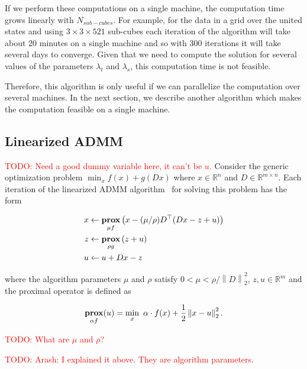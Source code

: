 \documentclass{article}
\newcommand{\attn}[1]{\textcolor{red}{TODO: #1}}
\newcommand{\norm}[1]{\left\lVert #1 \right\rVert}
\DeclareMathOperator*{\prox}{\bf prox}
\begin{document}
If we perform these computations on a single machine, the computation
time grows linearly with $N_{sub-cubes}$. For example, for the data in
a grid over the united states and using $3\times3\times521$ sub-cubes
each iteration of the algorithm will take about 20 minutes on a single
machine and so with 300 iterations it will take several days to
converge. Given that we need to compute the solution for several
values of the parameters $\lambda_t$ and $\lambda_s$, this computation
time is not feasible. 

Therefore, this algorithm is only useful if we can parallelize the
computation over several machines. In the next section, we describe
another algorithm which makes the computation feasible on a single
machine. 

\subsection{Linearized ADMM}
\label{sec:linADMM}


\attn{Need a good dummy variable here, it can't be $u$.} Consider the generic optimization problem
$\min_x f(x)+g(Dx)$
where $x\in \mathbb{R}^n$ and $D\in \mathbb{R}^{m\times n}$. Each
iteration of the linearized ADMM
algorithm~\citep{parikh_proximal_2014} for solving this problem 
has the form

\begin{align}
x & \leftarrow \prox_{\mu f} \left(x - (\mu/\rho)D^\top (D x - z + u )\right)\\
z & \leftarrow \prox_{\rho g} \left(z + u\right) \label{eq:linADMM_steps}\\
u & \leftarrow u + D x - z
\end{align}

\noindent where the algorithm parameters $\mu$ and $\rho$ satisfy $0 < \mu < \rho/\norm{D}_2^2$, $z,u\in \mathbb{R}^m$ and the proximal operator is defined as

\begin{equation}
 \prox_{\alpha f}(u) = \min_x \,\, \alpha \cdot f(x)+\frac{1}{2} \norm{ x-u}_2^2.
\label{eq:linADMM_prox}
\end{equation}

\attn{What are $\mu$ and $\rho$?}

\attn{Arash: I explained it above. They are algorithm parameters.}
\end{document}
